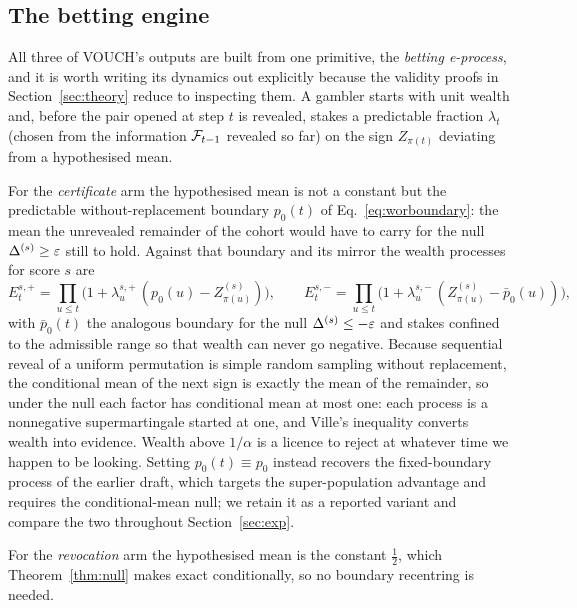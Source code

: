 \subsection{The betting engine}\label{sec:engine}

All three of VOUCH's outputs are built from one primitive, the \emph{betting
e-process}, and it is worth writing its dynamics out explicitly because the validity
proofs in Section~\ref{sec:theory} reduce to inspecting them. A gambler starts with
unit wealth and, before the pair opened at step $t$ is revealed, stakes a predictable
fraction $\lambda_t$ (chosen from the information $\mathcal{F}_{t-1}$ revealed so far) on the
sign $Z_{\pi(t)}$ deviating from a hypothesised mean.

For the \emph{certificate} arm the hypothesised mean is not a constant but the
predictable without-replacement boundary $p_0(t)$ of Eq.~\eqref{eq:worboundary}: the
mean the unrevealed remainder of the cohort would have to carry for the null
$\Delta^{(s)} \ge \varepsilon$ still to hold. Against that boundary and its mirror the wealth
processes for score $s$ are
\begin{equation}\label{eq:wealthwor}
E_t^{s,+} = \prod_{u \le t}\bigl(1 + \lambda_u^{s,+}\,(p_0(u) - Z^{(s)}_{\pi(u)})\bigr),
\qquad
E_t^{s,-} = \prod_{u \le t}\bigl(1 + \lambda_u^{s,-}\,(Z^{(s)}_{\pi(u)} - \bar p_0(u))\bigr),
\end{equation}
with $\bar p_0(t)$ the analogous boundary for the null $\Delta^{(s)} \le -\varepsilon$ and
stakes confined to the admissible range so that wealth can never go negative. Because
sequential reveal of a uniform permutation is simple random sampling without
replacement, the conditional mean of the next sign is exactly the mean of the
remainder, so under the null each factor has conditional mean at most one: each
process is a nonnegative supermartingale started at one, and Ville's inequality
converts wealth into evidence. Wealth above $1/\alpha$ is a licence to reject at
whatever time we happen to be looking. Setting $p_0(t) \equiv p_0$ instead recovers
the fixed-boundary process of the earlier draft, which targets the super-population
advantage and requires the conditional-mean null; we retain it as a reported variant
and compare the two throughout Section~\ref{sec:exp}.

For the \emph{revocation} arm the hypothesised mean is the constant $\tfrac12$, which
Theorem~\ref{thm:null} makes exact conditionally, so no boundary recentring is needed.

